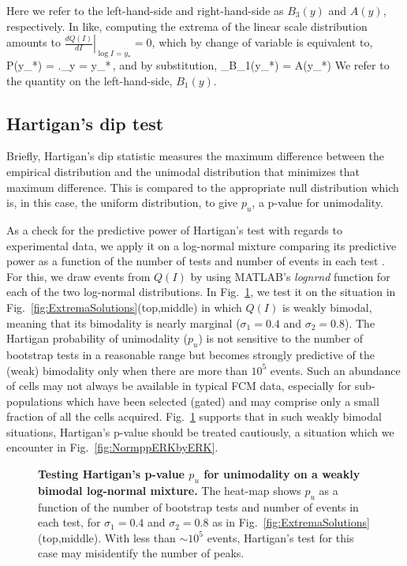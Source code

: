 \documentclass[11pt,a4paper,draft]{article}
\begin{document}
Here we refer to the left-hand-side and right-hand-side as $B_3(y)$ and $A(y)$, respectively. In like, computing the extrema of the linear scale distribution amounts to $\left.\frac{d Q(I)}{dI} \right\vert_{\log I= y_*} = 0$, which by change of variable is equivalent to,
%
\be
\label{eq:QExtremaStrange}
P(y_*) = \left.\right\vert_{y = y_*}\,,
\ee
%
and by substitution,
%
\be
  \label{eq:extremaQ}
  _{B_1(y_*)} = A(y_*) 
\ee
%
We refer to the quantity on the left-hand-side, $B_1(y)$.

\subsection*{Hartigan's dip test}
Briefly, Hartigan's dip statistic measures the maximum difference between the empirical distribution and the unimodal distribution that minimizes that maximum difference. This is compared to the appropriate null distribution which is, in this case, the uniform distribution, to give $p_u$, a p-value for unimodality.

As a check for the predictive power of Hartigan's test with regards to experimental data, we apply it on a log-normal mixture comparing its predictive power as a function of the number of tests and number of events in each test \cite{NicPrice}. For this, we draw events from $Q(I)$ by using MATLAB's \emph{lognrnd} function for each of the two log-normal distributions. In Fig.~\ref{fig:CheckHartigan}, we test it on the situation in Fig.~\ref{fig:ExtremaSolutions}(top,middle) in which $Q(I)$ is weakly bimodal, meaning that its bimodality is nearly marginal ($\sigma_1=0.4$ and $\sigma_2=0.8$). The Hartigan probability of unimodality ($p_u$) is not sensitive to the number of bootstrap tests in a reasonable range but becomes strongly predictive of the (weak) bimodality only when there are more than $10^5$ events. Such an abundance of cells may not always be available in typical FCM data, especially for sub-populations which have been selected (gated) and may comprise only a small fraction of all the cells acquired. Fig.~\ref{fig:CheckHartigan} supports that in such weakly bimodal situations, Hartigan's p-value should be treated cautiously, a situation which we encounter in Fig.~\ref{fig:NormppERKbyERK}. \smallskip

\begin{figure}[!ht]
 \centering
  \caption{\textbf{Testing Hartigan's p-value $p_u$ for unimodality on a weakly bimodal log-normal mixture.} The heat-map shows $p_u$ as a function of the number of bootstrap tests and number of events in each test, for $\sigma_1=0.4$ and $\sigma_2=0.8$ as in Fig.~\ref{fig:ExtremaSolutions}(top,middle). With less than $\sim10^5$ events, Hartigan's test for this case may misidentify the number of peaks.}
  \label{fig:CheckHartigan}
\end{figure}
\end{document}
